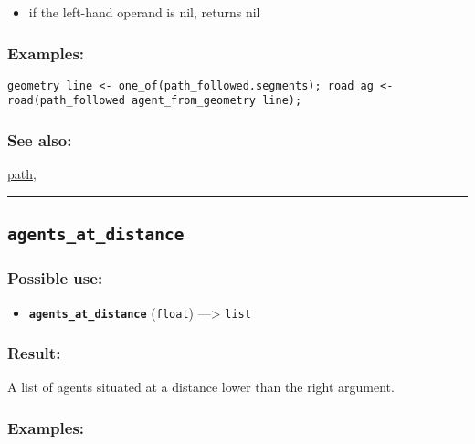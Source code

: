 \documentclass[]{book}
\providecommand{\tightlist}{%
  \setlength{\itemsep}{0pt}\setlength{\parskip}{0pt}}
\theoremstyle{definition}
\theoremstyle{definition}
\theoremstyle{definition}
\theoremstyle{remark}
\begin{document}
\begin{itemize}
\tightlist
\item
  if the left-hand operand is nil, returns nil
\end{itemize}

\subsubsection{Examples:}\label{examples-21}

\begin{verbatim}
geometry line <- one_of(path_followed.segments); road ag <- road(path_followed agent_from_geometry line); 
\end{verbatim}

\subsubsection{See also:}\label{see-also-20}

\href{OperatorsNR\#path}{path},

\begin{center}\rule{0.5\linewidth}{\linethickness}\end{center}

\subsection{\texorpdfstring{\texttt{agents\_at\_distance}}{agents\_at\_distance}}\label{agents_at_distance}

\subsubsection{Possible use:}\label{possible-use-29}

\begin{itemize}
\tightlist
\item
  \textbf{\texttt{agents\_at\_distance}} (\texttt{float})
  ---\textgreater{} \texttt{list}
\end{itemize}

\subsubsection{Result:}\label{result-28}

A list of agents situated at a distance lower than the right argument.

\subsubsection{Examples:}\label{examples-22}
\end{document}
